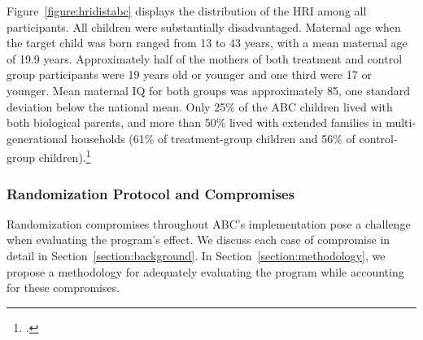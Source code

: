 \begin{appendices}
\noindent Figure~\ref{figure:hridistabc} displays the distribution of the HRI among all participants. All children were substantially disadvantaged. Maternal age when the target child was born ranged from 13 to 43 years, with a mean maternal age  of 19.9 years. Approximately half of the mothers of both treatment and control group participants were 19 years old or younger and one third were 17 or younger.  Mean maternal IQ for both groups was approximately 85, one standard deviation below the national mean. Only 25\% of the ABC children lived with both biological parents, and more than 50\% lived with extended families in multi-generational households (61\% of treatment-group children and 56\% of control-group children).\footnote{\citet{Ramey_Campbell_1991_childreninpoverty,Campbell_Ramey_1994_CD}.}\\

\subsubsection{Randomization Protocol and Compromises} \label{appendix:randomization}

\noindent Randomization compromises throughout ABC's implementation pose a challenge when evaluating the program's effect. We discuss each case of compromise in detail in Section~\ref{section:background}. In Section~\ref{section:methodology},  we propose a methodology for adequately evaluating the program while accounting for these compromises.


\end{appendices}
